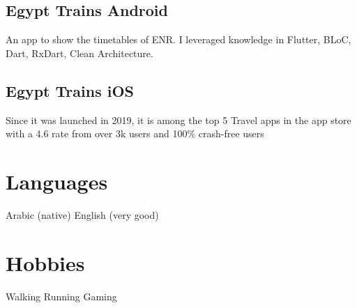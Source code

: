 \documentclass[]{deedy-resume-openfont}
\begin{document}
\begin{minipage}[t]{0.33\textwidth}
\subsection{Egypt Trains Android}
An app to show the timetables of ENR.
I leveraged knowledge in Flutter, BLoC, Dart, RxDart, Clean Architecture.
\sectionsep
\subsection{Egypt Trains iOS}
Since it was launched in 2019, it is among the top 5 Travel apps in the app store with a 4.6 rate from over 3k users and 100\% crash-free users
\sectionsep
\section{Languages}
Arabic (native) \textbullet{} English (very good)
\sectionsep

\section{Hobbies}
Walking \textbullet{} Running \textbullet{} Gaming
\end{minipage} 
\end{document}

